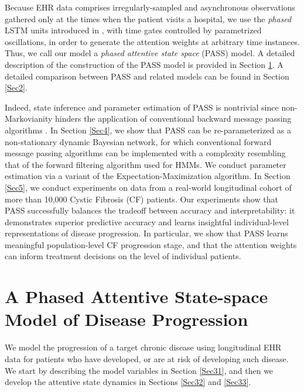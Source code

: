 \documentclass[twoside,11pt]{article}
\begin{document}
Because EHR data comprises irregularly-sampled and asynchronous observations gathered only at the times when the patient visits a hospital, we use the {\it phased} LSTM units introduced in \cite{neil2016phased}, with time gates controlled by parametrized oscillations, in order to generate the attention weights at arbitrary time instances. Thus, we call our model a {\it phased attentive state space} (PASS) model. A detailed description of the construction of the PASS model is provided in Section \ref{Sec3}. A detailed comparison between PASS and related models can be found in Section \ref{Sec2}. 

Indeed, state inference and parameter estimation of PASS is nontrivial since non-Markovianity hinders the application of conventional backward message passing algorithms \cite{alaa2016hidden,dai2016recurrent}. In Section \ref{Sec4}, we show that PASS can be re-parameterized as a non-stationary dynamic Bayesian network, for which conventional forward message passing algorithms can be implemented with a complexity resembling that of the forward filtering algorithm used for HMMs. We conduct parameter estimation via a variant of the Expectation-Maximization algorithm. In Section \ref{Sec5}, we conduct experiments on data from a real-world longitudinal cohort of more than 10,000 Cystic Fibrosis (CF) patients. Our experiments show that PASS successfully balances the tradeoff between accuracy and interpretability: it demonstrates superior predictive accuracy and learns insightful individual-level representations of disease progression. In particular, we show that PASS learns meaningful population-level CF progression stage, and that the attention weights can inform treatment decisions on the level of individual patients.    

\section{A Phased Attentive State-space Model of Disease Progression}
\label{Sec3}
We model the progression of a target chronic disease using longitudinal EHR data for patients who have developed, or are at risk of developing such disease. We start by describing the model variables in Section \ref{Sec31}, and then we develop the attentive state dynamics in Sections \ref{Sec32} and \ref{Sec33}. 
     
\end{document}
